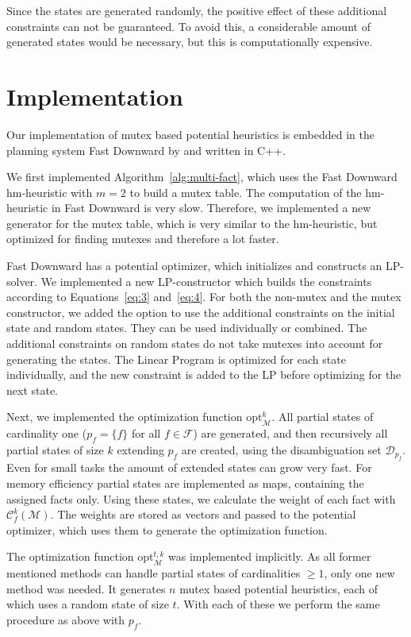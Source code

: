 Since the states are generated randomly, the positive effect of these additional constraints can not be guaranteed.
To avoid this, a considerable amount of generated states would be necessary, but this is computationally expensive.

\section{Implementation}\label{sec:implementation}
Our implementation of mutex based potential heuristics is embedded in the planning system Fast Downward by \citeauthor{helmert2006fast} and written in C++.

We first implemented Algorithm~\ref{alg:multi-fact}, which uses the Fast Downward hm-heuristic with $m=2$ to build a mutex table.
The computation of the hm-heuristic in Fast Downward is very slow.
Therefore, we implemented a new generator for the mutex table, which is very similar to the hm-heuristic, but optimized for finding mutexes and therefore a lot faster.

Fast Downward has a potential optimizer, which initializes and constructs an LP-solver.
We implemented a new LP-constructor which builds the constraints according to Equations~\eqref{eq:3} and~\eqref{eq:4}.
For both the non-mutex and the mutex constructor, we added the option to use the additional constraints on the initial state and random states.
They can be used individually or combined.
The additional constraints on random states do not take mutexes into account for generating the states.
The Linear Program is optimized for each state individually, and the new constraint is added to the LP before optimizing for the next state.

Next, we implemented the optimization function $\mathrm{opt}^k_\mathcal{M}$.
All partial states of cardinality one ($p_f = \{f\}$ for all $f\in\mathcal{F}$) are generated, and then recursively all partial states of size $k$ extending $p_f$ are created, using the disambiguation set $\mathcal{D}_{p_f}$.
Even for small tasks the amount of extended states can grow very fast.
For memory efficiency partial states are implemented as maps, containing the assigned facts only.
Using these states, we calculate the weight of each fact with $\mathcal{C}_f^k(\mathcal{M})$.
The weights are stored as vectors and passed to the potential optimizer, which uses them to generate the optimization function.

The optimization function $\mathrm{opt}^{t,k}_\mathcal{M}$ was implemented implicitly.
As all former mentioned methods can handle partial states of cardinalities $\geq 1$, only one new method was needed.
It generates $n$ mutex based potential heuristics, each of which uses a random state of size $t$.
With each of these we perform the same procedure as above with $p_f$.

